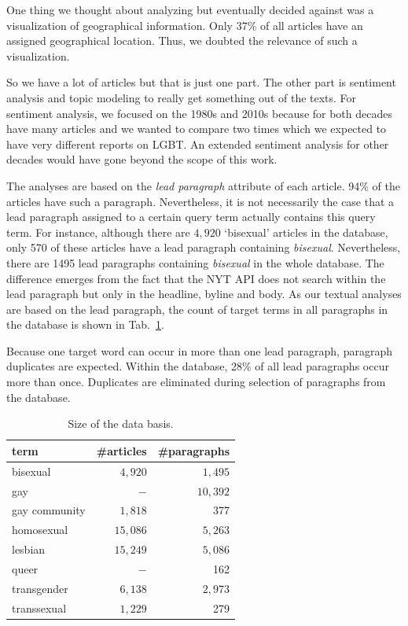 \documentclass[10pt,a4paper,twocolumn]{scrartcl}
\begin{document}
One thing we thought about analyzing but eventually decided against was a visualization of geographical information. Only 37\% of all articles have an assigned geographical location. Thus, we doubted the relevance of such a visualization.

So we have a lot of articles but that is just one part. The other part is sentiment analysis and topic modeling to really get something out of the texts. For sentiment analysis, we focused on the 1980s and 2010s because for both decades have many articles and we wanted to compare two times which we expected to have very different reports on LGBT. An extended sentiment analysis for other decades would have gone beyond the scope of this work.

The analyses are based on the \textit{lead paragraph} attribute of each article. 94\% of the articles have such a paragraph. Nevertheless, it is not necessarily the case that a lead paragraph assigned to a certain query term actually contains this query term. For instance, although there are $4,920$ `bisexual' articles in the database, only 570 of these articles have a lead paragraph containing \textit{bisexual}. Nevertheless, there are 1495 lead paragraphs containing \textit{bisexual} in the whole database. The difference emerges from the fact that the NYT API does not search within the lead paragraph but only in the headline, byline and body. As our textual analyses are based on the lead paragraph, the count of target terms in all paragraphs in the database is shown in Tab.~\ref{tab:dataBasis}.

Because one target word can occur in more than one lead paragraph, paragraph duplicates are expected. Within the database, 28\% of all lead paragraphs occur more than once. Duplicates are eliminated during selection of paragraphs from the database.

\begin{table}
\centering
\caption{Size of the data basis.} \label{tab:dataBasis}
\begin{tabular}{lrr}
\toprule
term	 & \#articles & \#paragraphs\\
\midrule
bisexual &  $4,920$ & $1,495$\\
gay			& $-$ & $10,392$\\
gay community & $1,818$ & 377\\
homosexual  & $15,086$ & $5,263$\\
lesbian & $15,249$ & $5,086$\\
queer  & $-$ & 162\\
transgender  & $6,138$ & $2,973$\\
transsexual  & $1,229$ & 279\\
\bottomrule
\end{tabular}
\end{table}
\end{document}
